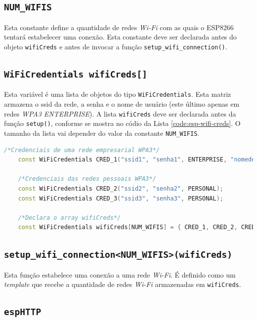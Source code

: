 \subsection{\texttt{NUM\_WIFIS}}

Esta constante define a quantidade de redes \textit{Wi-Fi} com as quais o ESP8266 tentará estabelecer uma conexão. Esta constante deve ser declarada antes do objeto \texttt{wifiCreds} e antes de invocar a função \texttt{setup\_wifi\_connection()}.

\subsection{\texttt{WiFiCredentials wifiCreds[]}}

Esta variável é uma lista de objetos do tipo \texttt{WiFiCredentials}. Esta matriz armazena o \acrshort*{ssid} da rede, a senha e o nome de usuário (este último apenas em redes \textit{WPA3 ENTERPRISE}). A lista \texttt{wifiCreds} deve ser declarada antes da função \texttt{setup()}, conforme se mostra no códio da Lista \ref{code:esp-wifi-creds}. O tamanho da lista vai depender do valor da constante \texttt{NUM\_WIFIS}.

\begin{lstlisting}[language=C++, caption=Definição dos identificadores dos sensores de um dispositivo]
    /*Credenciais de uma rede empresarial WPA3*/
    const WiFiCredentials CRED_1("ssid1", "senha1", ENTERPRISE, "nomedeusuario1");

    /*Credenciais das redes pessoais WPA3*/
    const WiFiCredentials CRED_2("ssid2", "senha2", PERSONAL);
    const WiFiCredentials CRED_3("ssid3", "senha3", PERSONAL);

    /*Declara o array wifiCreds*/
    const WiFiCredentials wifiCreds[NUM_WIFIS] = { CRED_1, CRED_2, CRED_3 };
\end{lstlisting}
\label{code:esp-wifi-creds}

\subsection{\texttt{setup\_wifi\_connection<NUM\_WIFIS>(wifiCreds)}}

Esta função estabelece uma conexão a uma rede \textit{Wi-Fi}. É definido como um \textit{template} que recebe a quantidade de redes \textit{Wi-Fi} armazenadas em \texttt{wifiCreds}.

\subsection{\texttt{espHTTP}}

